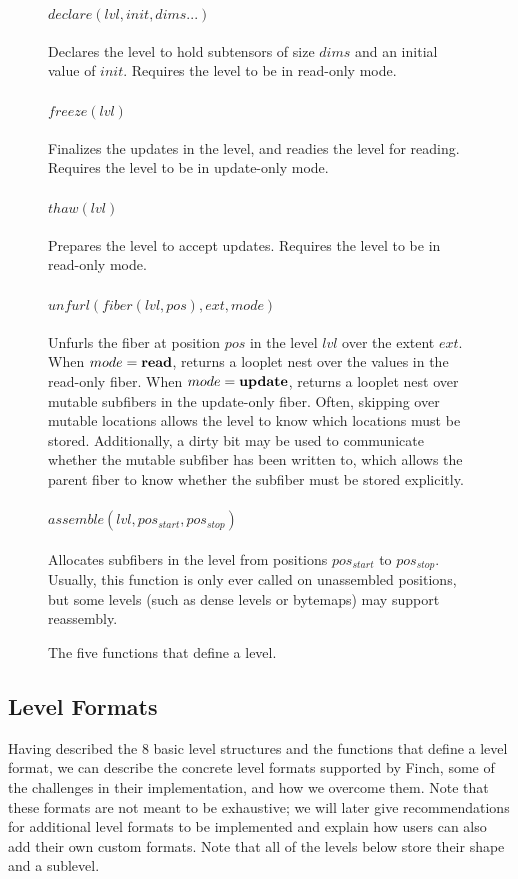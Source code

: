 \begin{figure}
    \raggedright
\paragraph{$declare(lvl, init, dims...)$} Declares the level to hold subtensors
of size $dims$ and an initial value of $init$. Requires the level to be in
read-only mode.
\paragraph{$freeze(lvl)$} Finalizes the updates in the level, and readies the
level for reading. Requires the level to be in update-only mode.
\paragraph{$thaw(lvl)$} Prepares the level to accept updates. Requires the level
to be in read-only mode.
\paragraph{$unfurl(fiber(lvl, pos), ext, mode)$} Unfurls the fiber at position
$pos$ in the level $lvl$ over the extent $ext$. When $mode = \text{\textbf{read}}$,
returns a looplet nest over the values in the read-only fiber.  When $mode =
\text{\textbf{update}}$, returns a looplet nest over mutable subfibers in the update-only
fiber. Often, skipping over mutable locations allows the level to know which
locations must be stored. Additionally, a dirty bit may be used to communicate
whether the mutable subfiber has been written to, which allows the parent fiber
to know whether the subfiber must be stored explicitly.
\paragraph{$assemble(lvl, pos_{start}, pos_{stop})$} Allocates subfibers in the
level from positions $pos_{start}$ to $pos_{stop}$. Usually, this function is
only ever called on unassembled positions, but some levels (such as dense levels
or bytemaps) may support reassembly.
\caption{The five functions that define a level.}
\end{figure}

\subsection{Level Formats}
Having described the 8 basic level structures and the functions that define a
level format, we can describe the concrete level formats supported by Finch,
some of the challenges in their implementation, and how we overcome them. Note
that these formats are not meant to be exhaustive; we will later give
recommendations for additional level formats to be implemented and explain how
users can also add their own custom formats. Note that all of the levels below store their shape and a sublevel.

